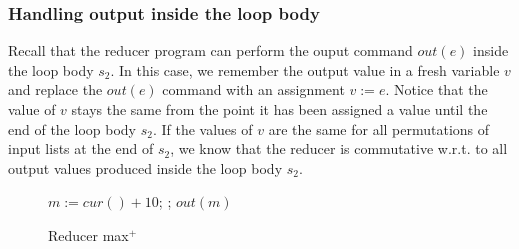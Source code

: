 \documentclass{llncs}
\newcommand{\cur}{cur()}
\begin{document}
\subsubsection{Handling output inside the loop body} Recall that the reducer program can perform the ouput command $out(e)$ inside the loop body $s_2$. In this case, we remember the output value in a fresh variable $v$ and replace the $out(e)$ command with an assignment $v:=e$.
Notice that the value of $v$ stays the same from the point it has been assigned a value until the end of the loop body $s_2$.
If the values of $v$ are the same for all permutations of input lists at the end of $s_2$, we know that the reducer is commutative w.r.t. to all output values produced inside the loop body $s_2$.

\begin{wrapfigure}{r}{3.5cm}
	\vspace{-1.5cm}
	\begin{algorithm}[H]
		\;\;$m := \cur + 10$; \;
		\Loop{}{
			$t:=\cur$\;
			\uIf{ $t> m$}{
				$m := t$ \;
			}
		};
		$out(m)$\;\;
	\end{algorithm}
	\vspace{-0.8cm}
	\caption{Reducer max$^+$}
	\vspace{-0.8cm}
	\label{fig:reducer_max1}
\end{wrapfigure}	


\end{document}
